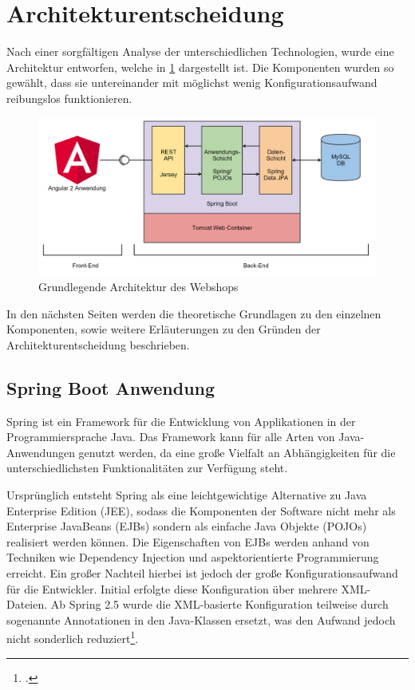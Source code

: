 \section{Architekturentscheidung}\label{arch_decission} \thispagestyle{nomarkstyle}
Nach einer sorgfältigen Analyse der unterschiedlichen Technologien, wurde eine Architektur entworfen, welche in \cref{fig:webshop_arch} dargestellt ist. Die Komponenten wurden so gewählt, dass sie untereinander mit möglichst wenig Konfigurationsaufwand reibungslos funktionieren. 

\begin{figure}[th!]
	\centering
	\includegraphics[width=\linewidth]{bilder/kap5/webshop_arch.png}
	\caption{Grundlegende Architektur des Webshops}
	\label{fig:webshop_arch}
\end{figure}

In den nächsten Seiten werden die theoretische Grundlagen zu den einzelnen Komponenten, sowie weitere Erläuterungen zu den Gründen der Architekturentscheidung beschrieben. 

\subsection{Spring Boot Anwendung}
Spring ist ein Framework für die Entwicklung von Applikationen in der Programmiersprache Java. Das Framework kann für alle Arten von Java-Anwendungen genutzt werden, da eine große Vielfalt an Abhängigkeiten für die unterschiedlichsten Funktionalitäten zur Verfügung steht.

Ursprünglich entsteht Spring als eine leichtgewichtige Alternative zu Java Enterprise Edition (\acs{JEE}), sodass die Komponenten der Software nicht mehr als Enterprise JavaBeans (\acs{EJB}s) sondern als einfache Java Objekte (\acs{POJO}s) realisiert werden können. Die Eigenschaften von \acs{EJB}s werden anhand von Techniken wie Dependency Injection und aspektorientierte Programmierung erreicht. Ein großer Nachteil hierbei ist jedoch der große Konfigurationsaufwand für die Entwickler. Initial erfolgte diese Konfiguration über mehrere \acs{XML}-Dateien. Ab Spring 2.5 wurde die \acs{XML}-basierte Konfiguration teilweise durch sogenannte Annotationen in den Java-Klassen ersetzt, was den Aufwand jedoch nicht sonderlich reduziert\footcite[Vgl.][S. 2]{Walls2015}.


